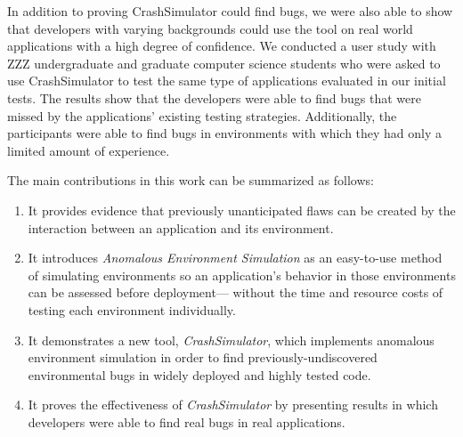 In addition to proving CrashSimulator could find bugs, we were also able to
show that developers with varying backgrounds
could use the tool
on real world applications
with a high degree of confidence.
We conducted a user study with
ZZZ undergraduate and graduate computer science students
who were asked to use CrashSimulator to test
the same type of applications evaluated in our initial tests.
The results show that the developers were able to find bugs
that were missed by the applications' existing testing strategies.
Additionally, the
participants were able to find bugs
in environments with which they had only a limited amount of experience.

The main contributions in this work can be summarized as follows:

\begin{enumerate}

\item{It provides evidence
that previously unanticipated flaws can be created by the interaction
between an application and its environment.}

\item{It introduces \textit{Anomalous Environment Simulation}
as an easy-to-use method of simulating environments
so an application's behavior in those environments
can be assessed before deployment---
without the time and resource costs of
testing each environment individually.}

\item{It demonstrates a new tool, {\em CrashSimulator},
which implements anomalous environment simulation
in order to find previously-undiscovered environmental bugs
in widely deployed and highly tested code.}

\item{It proves the effectiveness
of {\em CrashSimulator}
by presenting results
in which developers
were able to find real bugs in real applications.}

\end{enumerate}
